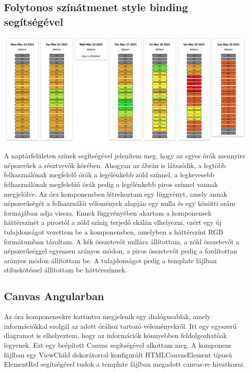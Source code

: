 \documentclass[a4paper,12pt]{report}
\theoremstyle{definition}
\theoremstyle{remark}
\begin{document}
	\subsection{Folytonos színátmenet style binding segítségével}

\begin{center}
\includegraphics[width=160mm]{week_view}
\captionsetup{width=0.8\linewidth}
\end{center}

A naptárfelületen színek segítségével jelenítem meg, hogy az egyes órák mennyire népszerűek a résztvevők körében. Ahogyan az ábrán is látszódik, a legtöbb felhasználónak megfelelő órák a legélénkebb zöld színnel, a legkevesebb felhasználónak megfelelúő órák pedig a legélénkebb piros színnel vannak megjelölve. Az óra komponensben létrehoztam egy függvényt, amely annak népszerűségét a felhasználói vélemények alapján egy nulla és egy közötti szám formájában adja vissza. Ennek függvényében akartam a komponensek háttérszínét a pirostól a zöld színig terjedő skálán elhelyezni, ezért egy új tulajdonságot vezettem be a komponensben, amelyben a háttérszínt RGB formátumban tároltam. A kék összetevőt nullára állítottam, a zöld összetevőt a népszerűséggel egyensen arányos módon, a piros összetevőt pedig a fordítottan arányos módon állítottam be. A tulajdonságot pedig a template fájlban stíluskötéssel állítottam be háttérszínnek.

	\subsection{Canvas Angularban}

Az óra komponensekre kattintva megjelenik egy dialógusablak, amely információkkal szolgál az adott órához tartozó véleményekről. Itt egy egyszerű diagramot is elhelyeztem, hogy az információk könnyebben feldolgozhatóak legyenek. Ezt egy beépített Canvas segítségével alkottam meg. A komponens fájlban egy ViewChild dekorátorral konfigurált HTMLCanvasElement típusú ElementRef segítségével tudok a template fájlban megadott canvas-re hivatkozni.
\end{document}
